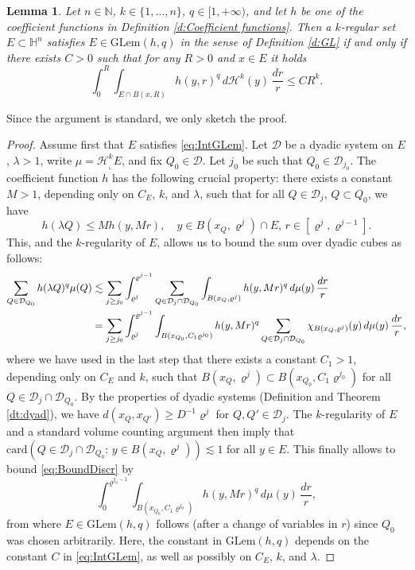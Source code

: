 \documentclass[12pt]{amsart}
\renewcommand{\rho}{\varrho}
\numberwithin{equation}{section}
\theoremstyle{plain}
\newtheorem{lemma}[theorem]{Lemma}
\theoremstyle{definition}
\theoremstyle{remark}
\begin{document}
\begin{lemma}\label{l:DiffGeomLem}
Let $n\in \mathbb{N}$, $k\in \{1,\ldots,n\}$, $q\in [1,+\infty)$, and let $h$ be one of the coefficient functions in Definition \ref{d:Coefficient functions}.
Then  a $k$-regular set $E\subset \mathbb{H}^n$ satisfies $E\in\mathrm{GLem}(h,q)$ in the sense of Definition \ref{d:GL} if and only if there exists $C>0$ such that for any $R>0$ and $x\in E$ it holds
\begin{equation}\label{eq:IntGLem}
    \int_0^R \int_{E\cap B(x,R)}h(y,r)^q\,d\mathcal{H}^k(y)\,\frac{dr}{r}\leq C R^k.
\end{equation}
\end{lemma}
Since the argument is standard, we only sketch the proof.
\begin{proof} Assume first that $E$ satisfies \eqref{eq:IntGLem}. Let $\mathcal{D}$ be a dyadic system on $E$, $\lambda>1$, write $\mu=\mathcal{H}^k_\llcorner E$, and fix $Q_0 \in \mathcal{D}$. Let $j_0$ be such that $Q_0 \in \mathcal{D}_{j_0}$. The coefficient function $h$ has the following crucial property: there exists a constant $M>1$, depending only on $C_E$, $k$, and $\lambda$, such that 
for all $Q\in \mathcal{D}_j$, $Q\subset Q_0$, we have 
\begin{equation}\label{eq:h-ball-cube}
    h(\lambda Q) \leq M h(y,M r),\quad y\in B(x_Q,\rho^{j})\cap E,\, r\in [\rho^{j},\rho^{j-1}].
\end{equation}
This, and the $k$-regularity of $E$, allows us to bound the sum over dyadic cubes as follows:
\begin{align}\label{eq:BoundDiscr}
    \sum_{Q\in\mathcal{D}_{Q_0}}h(\lambda Q)^q \mu(Q) &\lesssim
    \sum_{j\geq j_0} \int_{\rho^{j}}^{\rho^{j-1}}\sum_{Q\in \mathcal{D}_j\cap \mathcal{D}_{Q_0}}\int_{B(x_Q,\rho^j)}h(y,Mr)^q\,d\mu(y)\,\frac{dr}{r}\notag\\
   & =  \sum_{j\geq j_0} \int_{\rho^{j}}^{\rho^{j-1}} \int_{B(x_{Q_0},C_1 \rho^{j_0})}h(y,Mr)^q \sum_{Q\in \mathcal{D}_j\cap \mathcal{D}_{Q_0}}\chi_{B(x_Q,\rho^{j})}(y)\,d\mu(y)\,\frac{dr}{r},
\end{align}
where we have used in the last step that there exists a constant $C_1>1$, depending only on $C_E$ and $k$, such that $B(x_Q,\rho^j) \subset B(x_{Q_0},C_1 \rho^{j_0})$ for all $Q\in \mathcal{D}_j\cap  \mathcal{D}_{Q_0}$.  By the properties of dyadic systems (Definition and Theorem \ref{dt:dyad}), we have $d(x_Q,x_{Q'})\geq D^{-1} \rho^j$ for $Q,Q'\in \mathcal{D}_j$. The $k$-regularity of $E$ and a standard volume counting argument then imply that $\mathrm{card}(Q\in \mathcal{D}_j\cap \mathcal{D}_{Q_0}:\, y\in B(x_Q,\rho^j))\lesssim 1$ for all $y\in E$. This finally allows to bound \eqref{eq:BoundDiscr} by 
\begin{displaymath}
    \int_0^{\rho^{j_0-1}}\int_{B(x_{Q_0},C_1 \rho^{j_0})}h(y,Mr)^q \, d\mu(y)\,\frac{dr}{r},
\end{displaymath}
from where $E\in\mathrm{GLem}(h,q)$ follows (after a change of variables in $r$) since $Q_0$ was chosen arbitrarily. Here, the constant in $\mathrm{GLem}(h,q)$ depends on the constant $C$ in \eqref{eq:IntGLem}, as well as possibly on $C_E$, $k$, and $\lambda$. 


\end{proof}
\end{document}
